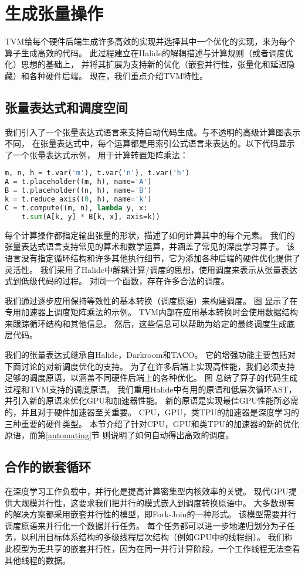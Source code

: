 \section{生成张量操作}
TVM给每个硬件后端生成许多高效的实现并选择其中一个优化的实现，来为每个算子生成高效的代码。
此过程建立在Halide的解耦描述与计算规则（或者调度优化）思想的基础上，
并将其扩展为支持新的优化（嵌套并行性，张量化和延迟隐藏）和各种硬件后端。
现在，我们重点介绍TVM特性。

\subsection{张量表达式和调度空间}
我们引入了一个张量表达式语言来支持自动代码生成。与不透明的高级计算图表示不同，
在张量表达式中，每个运算都是用索引公式语言来表达的。以下代码显示了一个张量表达式示例，
用于计算转置矩阵乘法：

\begin{lstlisting}[language={Python}]
m, n, h = t.var('m'), t.var('n'), t.var('h')
A = t.placeholder((m, h), name='A')
B = t.placeholder((n, h), name='B')
k = t.reduce_axis((0, h), name='k')
C = t.compute((m, n), lambda y, x:
    t.sum(A[k, y] * B[k, x], axis=k)) 
\end{lstlisting}

每个计算操作都指定输出张量的形状，描述了如何计算其中的每个元素。
我们的张量表达式语言支持常见的算术和数学运算，并涵盖了常见的深度学习算子。
该语言没有指定循环结构和许多其他执行细节，它为添加各种后端的硬件优化提供了灵活性。
我们采用了Halide中解耦计算/调度的思想，使用调度来表示从张量表达式到低级代码的过程。
对同一个函数，存在许多合法的调度。

我们通过逐步应用保持等效性的基本转换（调度原语）来构建调度。
图 显示了在专用加速器上调度矩阵乘法的示例。
TVM内部在应用基本转换时会使用数据结构来跟踪循环结构和其他信息。
然后，这些信息可以帮助为给定的最终调度生成底层代码。

我们的张量表达式继承自Halide，Darkroom和TACO。
它的增强功能主要包括对下面讨论的对新调度优化的支持。
为了在许多后端上实现高性能，我们必须支持足够的调度原语，以涵盖不同硬件后端上的各种优化。
图 总结了算子的代码生成过程和TVM支持的调度原语。
我们重用Halide中有用的原语和低层次循环AST，并引入新的原语来优化GPU和加速器性能。
新的原语是实现最佳GPU性能所必需的，并且对于硬件加速器至关重要。
CPU，GPU，类TPU的加速器是深度学习的三种重要的硬件类型。
本节介绍了针对CPU，GPU和类TPU的加速器的新的优化原语，而第\ref{automating}节
则说明了如何自动得出高效的调度。

\subsection{合作的嵌套循环}
在深度学习工作负载中，并行化是提高计算密集型内核效率的关键。
现代GPU提供大规模并行性，这要求我们把并行的模式嵌入到调度转换原语中。
大多数现有的解决方案都采用嵌套并行性的模型，即Fork-Join的一种形式。
该模型需要并行调度原语来并行化一个数据并行任务。
每个任务都可以进一步地递归划分为子任务，以利用目标体系结构的多级线程层次结构（例如GPU中的线程组）。
我们称此模型为无共享的嵌套并行性，因为在同一并行计算阶段，一个工作线程无法查看其他线程的数据。

